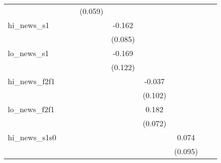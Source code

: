 {\begin{tabular}{l*{8}{c}}
            &                     &                     &     (0.059)         &                     &                     &                     &                     &                     \\
\addlinespace
hi\_news\_s1  &                     &                     &                     &      -0.162\sym{*}  &                     &                     &                     &                     \\
            &                     &                     &                     &     (0.085)         &                     &                     &                     &                     \\
\addlinespace
lo\_news\_s1  &                     &                     &                     &      -0.169         &                     &                     &                     &                     \\
            &                     &                     &                     &     (0.122)         &                     &                     &                     &                     \\
\addlinespace
hi\_news\_f2f1&                     &                     &                     &                     &      -0.037         &                     &                     &                     \\
            &                     &                     &                     &                     &     (0.102)         &                     &                     &                     \\
\addlinespace
lo\_news\_f2f1&                     &                     &                     &                     &       0.182\sym{**} &                     &                     &                     \\
            &                     &                     &                     &                     &     (0.072)         &                     &                     &                     \\
\addlinespace
hi\_news\_s1s0&                     &                     &                     &                     &                     &       0.074         &                     &                     \\
            &                     &                     &                     &                     &                     &     (0.095)         &                     &                     \\

\end{tabular}}
